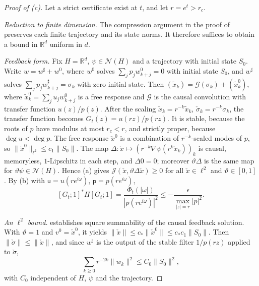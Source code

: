 \documentclass[11pt]{article}
\theoremstyle{definition}
\theoremstyle{remark}
\newcommand{\R}{\mathbb R}
\newcommand{\cS}{\mathcal N}\newcommand{\Szero}{\mathcal S_0}
\newcommand{\norm}[1]{\lVert #1\rVert}
\begin{document}
\begin{proof}[Proof of (c)]
Let a strict certificate exist at \(t\), and let \(r=e^t>r_c\).

\emph{Reduction to finite dimension.}  The compression argument in the proof of
 preserves each finite trajectory and its state norms.
It therefore suffices to obtain a bound in \(\R^d\) uniform in \(d\).

\emph{Feedback form.}  Fix \(H=\R^d\), \(\psi\in\cS(H)\) and a trajectory with initial
state \(S_0\).  Write \(w=w^\sharp+w^0\), where \(w^0\) solves \(\sum_jp_jw^0_{k+j}=0\) with
initial state \(S_0\), and \(w^\sharp\) solves \(\sum_jp_jw^\sharp_{k+j}=\sigma_k\) with zero initial
state.  Then \((\tilde x_k)=\mathcal G(\sigma_k)+(\tilde x^0_k)\), where \(\tilde x^0_k=\sum_ju_jw^0_{k+j}\) is a free response
and \(\mathcal G\) is the causal convolution with transfer function \(u(z)/p(z)\).
After the scaling \(\check x_k=r^{-k}\tilde x_k\), \(\check\sigma_k=r^{-k}\sigma_k\), the transfer function
becomes \(G_t(z)=u(r z)/p(r z)\).  It is stable, because the roots of \(p\) have
modulus at most \(r_c<r\), and strictly proper, because \(\deg u<\deg p\).  The
free response \(\check x^0\) is a combination of \(r^{-k}\)-scaled modes of \(p\), so
\(\norm{\check x^0}_{\ell^2}\le c_1\norm{S_0}\).  The map
\(\Delta:\check x\mapsto(r^{-k}\nabla\psi(r^k\check x_k))_k\) is causal, memoryless, \(1\)-Lipschitz in
each step, and \(\Delta0=0\); moreover \(\vartheta\Delta\) is the same map for
\(\vartheta\psi\in\cS(H)\).  Hence (a) gives \(\mathcal J(\check x,\vartheta\Delta\check x)\ge0\) for
all \(\check x\in\ell^2\) and \(\vartheta\in[0,1]\).  By (b) with \(\mathsf u=u(r e^{i\omega})\),
\(\mathsf p=p(r e^{i\omega})\),
\[
[G_t;1]^*\Pi[G_t;1]=\frac{\Phi_t(|\omega|)}{|p(r e^{i\omega})|^2}\le-\frac{\epsilon}{\max_{|z|=r}|p|^2}.
\]

\emph{An \(\ell^2\) bound.}   establishes square summability of the
causal feedback solution.
With \(\vartheta=1\) and \(v^0=\check x^0\), it yields
\(\norm{\check x}\le c_*\norm{\check x^0}\le c_*c_1\norm{S_0}\).  Then \(\norm{\check\sigma}\le\norm{\check x}\), and since
\(w^\sharp\) is the output of the stable filter \(1/p(r z)\) applied to \(\check\sigma\),
\begin{equation}\label{eq:l2}
\sum_{k\ge0}r^{-2k}\norm{w_k}^2\le C_0\norm{S_0}^2,
\end{equation}
with \(C_0\) independent of \(H\), \(\psi\) and the trajectory.


\end{proof}
\end{document}
